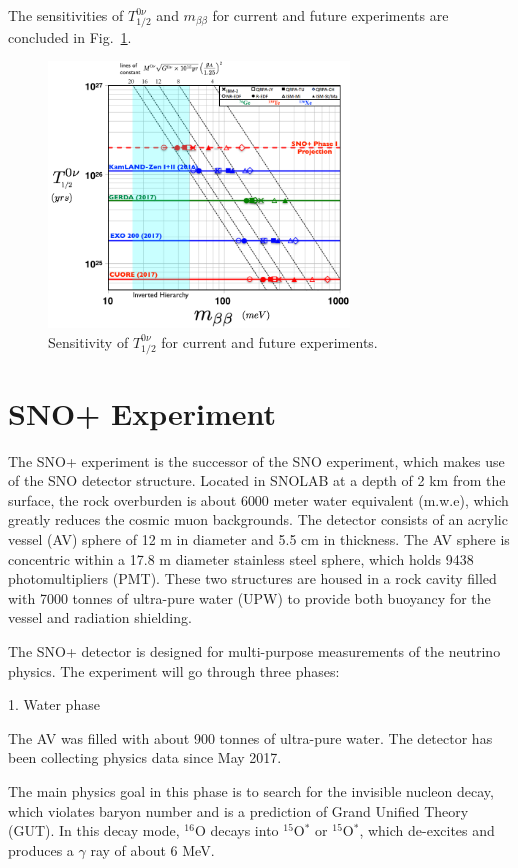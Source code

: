 \documentclass[preprint,12pt]{elsarticle}
\numberwithin{equation}{section}
\begin{document}
The sensitivities of $T^{0\nu}_{1/2}$ and $m_{\beta\beta}$ for current and future experiments are concluded in Fig.~\ref{biller}\cite{stevenbiller}.
\begin{figure}[htbp]
	\centering	
	\includegraphics[width=8cm]{0nbbComparisonAug2017.png}
	\caption{Sensitivity of $T^{0\nu}_{1/2}$ for current and future experiments.}
	\label{biller}
\end{figure}

\section{SNO+ Experiment}
The SNO+ experiment is the successor of the SNO experiment, which makes use of the SNO detector structure. Located in SNOLAB at a depth of 2 km from the surface, the rock overburden is about 6000 meter water equivalent (m.w.e), which greatly reduces the cosmic muon backgrounds. The detector consists of an acrylic vessel (AV) sphere of 12 m in diameter and 5.5 cm in thickness. The AV sphere is concentric within a 17.8 m diameter stainless steel sphere, which holds 9438 photomultipliers (PMT). These two structures are housed in a rock cavity filled with 7000 tonnes of ultra-pure water (UPW) to provide both buoyancy for the vessel and radiation shielding\cite{whitepaper, erica}.

The SNO+ detector is designed for multi-purpose measurements of the neutrino physics.
The experiment will go through three phases\cite{whitepaper}: 

1. Water phase 

The AV was filled with about 900 tonnes of ultra-pure water. The detector has been collecting physics data since May 2017.

The main physics goal in this phase is to search for the invisible nucleon decay, which violates baryon number and is a prediction of Grand Unified Theory (GUT). In this decay mode, $^{16}$O decays into $^{15}$O$^*$ or $ ^{15}$O$^*$, which de-excites and produces a $\gamma$ ray of about 6 MeV.
\end{document}
